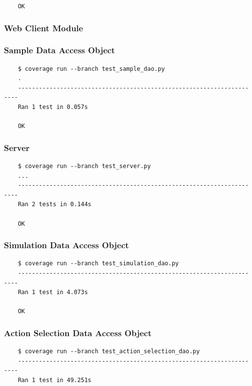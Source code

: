 \documentclass[a4paper,11pt]{article}
\begin{document}
\begin{appendices}
\begin{verbatim}
    OK
\end{verbatim}

\subsubsection{Web Client Module}
\subsubsection*{{\hspace{6mm}}Sample Data Access Object}
\begin{verbatim}
    $ coverage run --branch test_sample_dao.py 
    .
    ----------------------------------------------------------------------
    Ran 1 test in 0.057s

    OK
\end{verbatim}

\subsubsection*{{\hspace{6mm}}Server}
\begin{verbatim}
    $ coverage run --branch test_server.py
    ...
    ----------------------------------------------------------------------
    Ran 2 tests in 0.144s

    OK
\end{verbatim}

\subsubsection*{{\hspace{6mm}}Simulation Data Access Object}
\begin{verbatim}
    $ coverage run --branch test_simulation_dao.py
    ----------------------------------------------------------------------
    Ran 1 test in 4.073s

    OK
\end{verbatim}

\subsubsection*{{\hspace{6mm}}Action Selection Data Access Object}
\begin{verbatim}
    $ coverage run --branch test_action_selection_dao.py
    ----------------------------------------------------------------------
    Ran 1 test in 49.251s


\end{verbatim}
\end{appendices}
\end{document}
